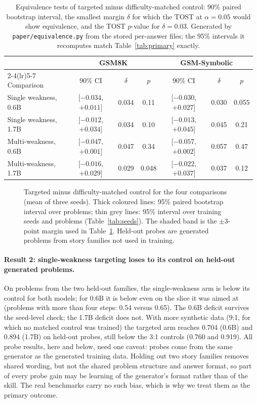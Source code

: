 \documentclass[11pt]{article}
\begin{document}
\begin{table}[t]
\centering
\caption{Equivalence tests of targeted minus difficulty-matched control: 90\% paired bootstrap interval, the smallest
margin $\delta$ for which the TOST at $\alpha=0.05$ would show equivalence, and the TOST $p$-value for $\delta=0.03$.
Generated by \texttt{paper/equivalence.py} from the stored per-answer files; the 95\% intervals it recomputes match
Table~\ref{tab:primary} exactly.}
\label{tab:equiv}
\small
\begin{tabular}{lcccccc}
\toprule
& \multicolumn{3}{c}{GSM8K} & \multicolumn{3}{c}{GSM-Symbolic} \\
\cmidrule(lr){2-4}\cmidrule(lr){5-7}
Comparison & 90\% CI & $\delta$ & $p$ & 90\% CI & $\delta$ & $p$ \\
\midrule
Single weakness, 0.6B & [$-0.034$, $+0.011$] & 0.034 & 0.11 & [$-0.030$, $+0.027$] & 0.030 & 0.055 \\
Single weakness, 1.7B & [$-0.012$, $+0.034$] & 0.034 & 0.10 & [$-0.013$, $+0.045$] & 0.045 & 0.21 \\
Multi-weakness, 0.6B  & [$-0.047$, $+0.001$] & 0.047 & 0.34 & [$-0.057$, $+0.002$] & 0.057 & 0.47 \\
Multi-weakness, 1.7B  & [$-0.016$, $+0.029$] & 0.029 & 0.048 & [$-0.022$, $+0.037$] & 0.037 & 0.12 \\
\bottomrule
\end{tabular}
\end{table}

\begin{figure}[t]
\centering

\caption{Targeted minus difficulty-matched control for the four comparisons (mean of three seeds). Thick coloured
lines: 95\% paired bootstrap interval over problems; thin grey lines: 95\% interval over training seeds and problems
(Table~\ref{tab:seeds}). The shaded band is the $\pm3$-point margin used in Table~\ref{tab:equiv}. Held-out probes are
generated problems from story families not used in training.}
\label{fig:forest}
\end{figure}

\paragraph{Result 2: single-weakness targeting loses to its control on held-out generated problems.} On problems from
the two held-out families, the single-weakness arm is below its control for both models; for 0.6B it is below even on
the slice it was aimed at (problems with more than four steps: 0.54 versus 0.65). The 0.6B deficit survives the
seed-level check; the 1.7B deficit does not. With more synthetic data (9:1, for which no matched control was trained)
the targeted arm reaches 0.704 (0.6B) and 0.894 (1.7B) on held-out probes, still below the 3:1 controls (0.760 and
0.919). All probe results, here and below, need one caveat: probes come from the same generator as the
generated training data. Holding out two story families removes shared wording, but not the shared problem structure
and answer format, so part of every probe gain may be learning of the generator's format rather than of the skill. The
real benchmarks carry no such bias, which is why we treat them as the primary outcome.
\end{document}
